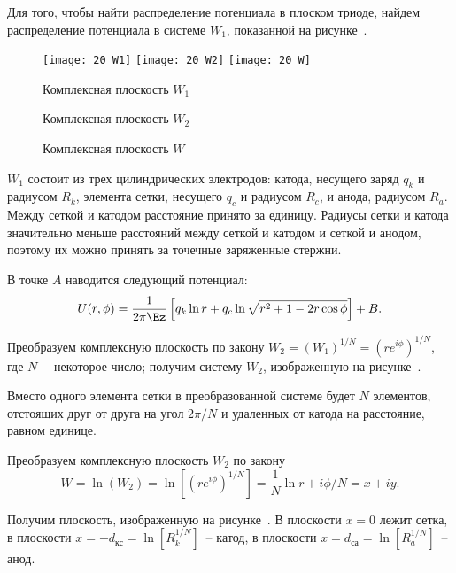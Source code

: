 
Для того, чтобы найти распределение потенциала в плоском триоде, найдем
распределение потенциала в системе \( W_1 \), показанной на рисунке~.

\begin{figure}[h!]
  \center
  \texttt{[image: 20\_W1]} \hspace{1em}
  \texttt{[image: 20\_W2]} \hspace{1em}
  \texttt{[image: 20\_W]} \\
  \parbox{.3\textwidth}{\caption{Комплексная плоскость \( W_1 \)}
    \label{pic20W1}} \hspace{1em}
  \parbox{.3\textwidth}{\caption{Комплексная плоскость \( W_2 \)}
    \label{pic20W2}} \hspace{1em}
  \parbox{.3\textwidth}{\caption{Комплексная плоскость \( W \)}
    \label{pic20W}}
\end{figure}

\( W_1 \) состоит из трех цилиндрических электродов: катода, несущего заряд
\( q_k \) и радиусом \( R_k \), элемента сетки, несущего \( q_c \) и радиусом
\( R_c \), и анода, радиусом \( R_a \). Между сеткой и катодом расстояние
принято за единицу. Радиусы сетки и катода значительно меньше расстояний между
сеткой и катодом и сеткой и анодом, поэтому их можно принять за точечные
заряженные стержни.

В точке \( A \) наводится следующий потенциал:
\begin{equation}
  U(r, \phi) = \frac{1}{2\pi\Ez}\left[ q_k\ln r + q_c\ln\sqrt{r^2 + 1 -
    2r\cos\phi} \right] + B.
  \label{eq20U1}
\end{equation}

Преобразуем комплексную плоскость по закону
\( W_2 = (W_1)^{1 / N} = (re^{i\phi})^{1 / N} \), где \( N \)~-- некоторое
число; получим систему \( W_2 \), изображенную на рисунке~.

Вместо одного элемента сетки в преобразованной системе будет \( N \) элементов,
отстоящих друг от друга на угол \( 2\pi / N \) и удаленных от катода на
расстояние, равном единице.

Преобразуем комплексную плоскость \( W_2 \) по закону
\[
  W = \ln(W_2) = \ln\left[ (re^{i\phi})^{1 / N} \right] = \frac{1}{N}\ln r +
    i\phi / N = x + iy.
\]

Получим плоскость, изображенную на рисунке~. В плоскости \( x = 0 \)
лежит сетка, в плоскости \( x = -d_\text{кс} = \ln\left[ R_k^{1 / N}
\right] \)~-- катод, в плоскости \( x = d_\text{са} =
\ln\left[ R_a^{1 / N} \right] \)~-- анод.

